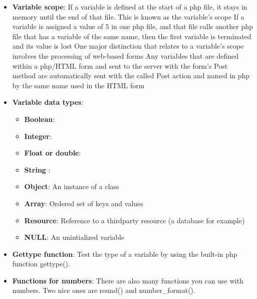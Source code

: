 \documentclass{report}
\begin{document}
\begin{itemize}
\begin{itemize}
            \end{itemize}
            \bigbreak \noindent 
        \item \textbf{Variable scope}:  If a variable is defined at the start of a php file, it stays in memory until the end of that file. This is known as the variable’s scope
            \bigbreak \noindent 
            If a variable is assigned a value of 5 in one php file, and that file calls another php file that has a variable of the same name, then the first variable is terminated and its value is lost
            \bigbreak \noindent 
            One major distinction that relates to a variable’s scope involves the processing of web-based forms
            \bigbreak \noindent 
            Any variables that are defined within a php/HTML form and sent to the server with the form’s Post method are automatically sent with the called Post action and named in php by the same name used in the HTML form
        \item \textbf{Variable data types}: 
            \begin{itemize}
                \item \textbf{Boolean}: 
                \item \textbf{Integer}:
                \item \textbf{Float or double}:
                \item \textbf{String }:
                \item \textbf{Object}:  An instance of a class
                \item \textbf{Array}:  Ordered set of keys and values
                \item \textbf{Resource}: Reference to a thirdparty resource (a database for example)
                \item \textbf{NULL}: An unintialized variable
            \end{itemize}
        \item \textbf{Gettype function}: Test the type of a variable by using the built-in php function gettype().
        \item \textbf{Functions for numbers}: There are also many functions you can use with numbers. Two nice ones are round() and number\_format().

\end{itemize}
\end{document}

